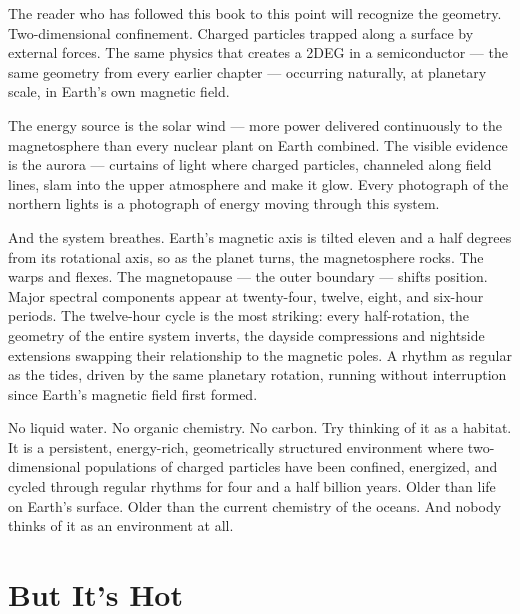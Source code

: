 The reader who has followed this book to this point will recognize the geometry. Two-dimensional confinement. Charged particles trapped along a surface by external forces. The same physics that creates a 2DEG in a semiconductor --- the same geometry from every earlier chapter --- occurring naturally, at planetary scale, in Earth's own magnetic field.

The energy source is the solar wind --- more power delivered continuously to the magnetosphere than every nuclear plant on Earth combined. The visible evidence is the aurora --- curtains of light where charged particles, channeled along field lines, slam into the upper atmosphere and make it glow. Every photograph of the northern lights is a photograph of energy moving through this system.


And the system breathes. Earth's magnetic axis is tilted eleven and a half degrees from its rotational axis, so as the planet turns, the magnetosphere rocks. The  warps and flexes. The magnetopause --- the outer boundary --- shifts position. Major spectral components appear at twenty-four, twelve, eight, and six-hour periods. The twelve-hour cycle is the most striking: every half-rotation, the geometry of the entire system inverts, the dayside compressions and nightside extensions swapping their relationship to the magnetic poles. A rhythm as regular as the tides, driven by the same planetary rotation, running without interruption since Earth's magnetic field first formed.


No liquid water. No organic chemistry. No carbon. Try thinking of it as a habitat.  It is a persistent, energy-rich, geometrically structured environment where two-dimensional populations of charged particles have been confined, energized, and cycled through regular rhythms for four and a half billion years. Older than life on Earth's surface. Older than the current chemistry of the oceans. And nobody thinks of it as an environment at all.

\section*{But It's Hot}
\label{pos32:but-its-hot}


